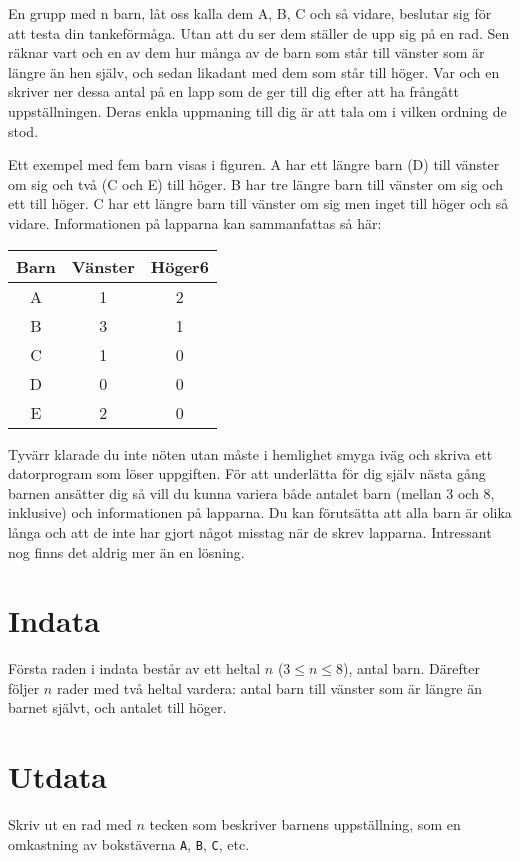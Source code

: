 En grupp med n barn, låt oss kalla dem A, B, C och så vidare, beslutar sig för att testa din tankeförmåga.
Utan att du ser dem ställer de upp sig på en rad.
Sen räknar vart och en av dem hur många av de barn som står till vänster som är längre än hen själv, och sedan likadant med dem som står till höger.
Var och en skriver ner dessa antal på en lapp som de ger till dig efter att ha frångått uppställningen.
Deras enkla uppmaning till dig är att tala om i vilken ordning de stod.

Ett exempel med fem barn visas i figuren.
A har ett längre barn (D) till vänster om sig och två (C och E) till höger.
B har tre längre barn till vänster om sig och ett till höger.
C har ett längre barn till vänster om sig men inget till höger och så vidare.
Informationen på lapparna kan sammanfattas så här:

\begin{tabular}{|c|c|c|}
\hline
  Barn&Vänster&Höger6\\\hline
  A&1&2\\
  B&3&1\\
  C&1&0\\
  D&0&0\\
  E&2&0\\\hline
\end{tabular}

Tyvärr klarade du inte nöten utan måste i hemlighet smyga iväg och skriva ett datorprogram som löser uppgiften.
För att underlätta för dig själv nästa gång barnen ansätter dig så vill du kunna variera både antalet barn (mellan 3 och 8, inklusive) och informationen på lapparna.
Du kan förutsätta att alla barn är olika långa och att de inte har gjort något misstag när de skrev lapparna.
Intressant nog finns det aldrig mer än en lösning.

\section*{Indata}
Första raden i indata består av ett heltal $n$ ($3 \le n \le 8$), antal barn.
Därefter följer $n$ rader med två heltal vardera: antal barn till vänster som är längre än barnet självt, och antalet till höger.

\section*{Utdata}
Skriv ut en rad med $n$ tecken som beskriver barnens uppställning, som en omkastning av bokstäverna \texttt{A}, \texttt{B}, \texttt{C}, etc.
